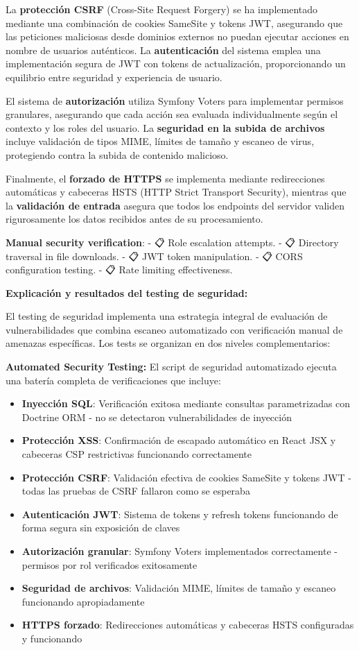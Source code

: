 \documentclass[12pt,a4paper,oneside]{report}
\begin{document}
La \textbf{protección CSRF} (Cross-Site Request Forgery) se ha implementado mediante una combinación de cookies SameSite y tokens JWT, asegurando que las peticiones maliciosas desde dominios externos no puedan ejecutar acciones en nombre de usuarios auténticos. La \textbf{autenticación} del sistema emplea una implementación segura de JWT con tokens de actualización, proporcionando un equilibrio entre seguridad y experiencia de usuario.

El sistema de \textbf{autorización} utiliza Symfony Voters para implementar permisos granulares, asegurando que cada acción sea evaluada individualmente según el contexto y los roles del usuario. La \textbf{seguridad en la subida de archivos} incluye validación de tipos MIME, límites de tamaño y escaneo de virus, protegiendo contra la subida de contenido malicioso.

Finalmente, el \textbf{forzado de HTTPS} se implementa mediante redirecciones automáticas y cabeceras HSTS (HTTP Strict Transport Security), mientras que la \textbf{validación de entrada} asegura que todos los endpoints del servidor validen rigurosamente los datos recibidos antes de su procesamiento.

\textbf{Manual security verification}: - 📋 Role escalation attempts. -
📋 Directory traversal in file downloads. - 📋 JWT token manipulation. -
📋 CORS configuration testing. - 📋 Rate limiting effectiveness.

\textbf{Explicación y resultados del testing de seguridad:}

El testing de seguridad implementa una estrategia integral de evaluación de vulnerabilidades que combina escaneo automatizado con verificación manual de amenazas específicas. Los tests se organizan en dos niveles complementarios:

\textbf{Automated Security Testing:} El script de seguridad automatizado ejecuta una batería completa de verificaciones que incluye:
\begin{itemize}
\item \textbf{Inyección SQL}: Verificación exitosa mediante consultas parametrizadas con Doctrine ORM - no se detectaron vulnerabilidades de inyección
\item \textbf{Protección XSS}: Confirmación de escapado automático en React JSX y cabeceras CSP restrictivas funcionando correctamente
\item \textbf{Protección CSRF}: Validación efectiva de cookies SameSite y tokens JWT - todas las pruebas de CSRF fallaron como se esperaba
\item \textbf{Autenticación JWT}: Sistema de tokens y refresh tokens funcionando de forma segura sin exposición de claves
\item \textbf{Autorización granular}: Symfony Voters implementados correctamente - permisos por rol verificados exitosamente
\item \textbf{Seguridad de archivos}: Validación MIME, límites de tamaño y escaneo funcionando apropiadamente
\item \textbf{HTTPS forzado}: Redirecciones automáticas y cabeceras HSTS configuradas y funcionando
\end{itemize}
\end{document}
